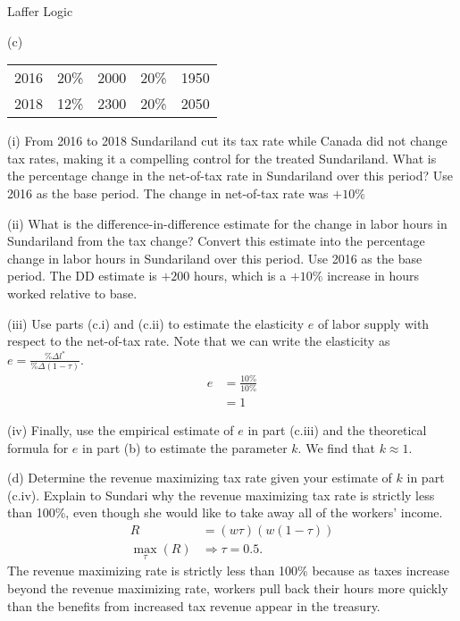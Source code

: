 \documentclass[10pt]{extarticle}
\begin{document}
\begin{problem}{Laffer Logic}
\begin{problem}{(c)}
\begin{center}
\begin{tabular}{c|cc|cc}
          \hline
          2016 & 20\% & 2000 & 20\% & 1950\\
          2018 & 12\% & 2300 & 20\% & 2050\\
          \hline
        \end{tabular}
      \end{center}
      \tcblower
      \begin{problem}{(i)}
        From 2016 to 2018 Sundariland cut its tax rate while Canada did not change tax rates, making it a compelling control for the treated Sundariland. What is the percentage change in the net-of-tax rate in Sundariland over this period? Use 2016 as the base period.
        \tcblower
        The change in net-of-tax rate was $+10\%$
      \end{problem}
      \begin{problem}{(ii)}
        What is the difference-in-difference estimate for the change in labor hours in Sundariland from the tax change? Convert this estimate into the percentage change in labor hours in Sundariland over this period. Use 2016 as the base period.
        \tcblower
        The DD estimate is $+200$ hours, which is a $+10\%$ increase in hours worked relative to base.
      \end{problem}
      \begin{problem}{(iii)}
        Use parts (c.i) and (c.ii) to estimate the elasticity $e$ of labor supply with respect to the net-of-tax rate. Note that we can write the elasticity as $e = \frac{\%\Delta l^{\ast}}{\%\Delta(1-\tau)}$.
        \tcblower
        \begin{align*}
          e &= \frac{10\%}{10\%}\\
          &= 1
        \end{align*}
      \end{problem}
      \begin{problem}{(iv)}
        Finally, use the empirical estimate of $e$ in part (c.iii) and the theoretical formula for $e$ in part (b) to estimate the parameter $k$.
        \tcblower
        We find that $k\approx 1$.
      \end{problem}
    \end{problem}
    \begin{problem}{(d)}
      Determine the revenue maximizing tax rate given your estimate of $k$ in part (c.iv). Explain to Sundari why the revenue maximizing tax rate is strictly less than 100\%, even though she would like to take away all of the workers' income.
      \tcblower
      \begin{align*}
        R &= \left(w\tau\right)\left(w(1-\tau)\right)\\
        \max_{\tau}(R) &\Rightarrow \tau = 0.5.
      \end{align*}
      The revenue maximizing rate is strictly less than 100\% because as taxes increase beyond the revenue maximizing rate, workers pull back their hours more quickly than the benefits from increased tax revenue appear in the treasury.
    \end{problem}
  \end{problem}
\end{document}
